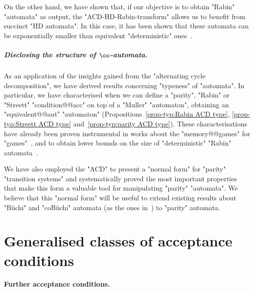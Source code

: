 \documentclass{theoretics}
\begin{document}
On the other hand, we have shown that, if our objective is to obtain "Rabin" "automata" as output, the "ACD-HD-Rabin-transform" allows us to benefit from succinct "HD automata". In this case, it has been shown that these automata can be exponentially smaller than equivalent "deterministic" ones~\cite[Theorem~21]{CCL22SizeGFG}.


\subparagraph*{Disclosing the structure of $\oo$-automata.} As an application of the insights gained from the "alternating cycle decomposition", we have derived results concerning "typeness" of "automata". In particular, we have characterised when we can define a "parity", "Rabin" or "Streett" "condition@@acc" on top of a "Muller" "automaton", obtaining an "equivalent@@aut" "automaton" (Propositions~\ref{prop-typ:Rabin ACD type}, \ref{prop-typ:Streett ACD type} and~\ref{prop-typ:parity ACD type}). These characterisations have already been proven instrumental in works about the "memory@@games" for "games"~\cite{Casares2021Chromatic}, and to obtain lower bounds on the size of "deterministic" "Rabin" automata~\cite{CCL22SizeGFG}.

We have also employed the "ACD" to present a "normal form" for "parity" "transition systems" and systematically proved the most important properties that make this form a valuable tool for manipulating "parity" "automata". We believe that this "normal form" will be useful to extend existing results about "B\"uchi" and "coB\"uchi" automata (as the ones in~\cite{AK22MinimizingGFG,BKS17HowDeterministicGFG, BCRV22HalfPosBuchi}) to "parity" automata.
 	
    \printbibliography
	
	\newpage
	\appendix
	\section{Generalised classes of acceptance conditions}
	\label{sec:appendix-weak-conditions}
	\paragraph*{Further acceptance conditions.}
\end{document}

